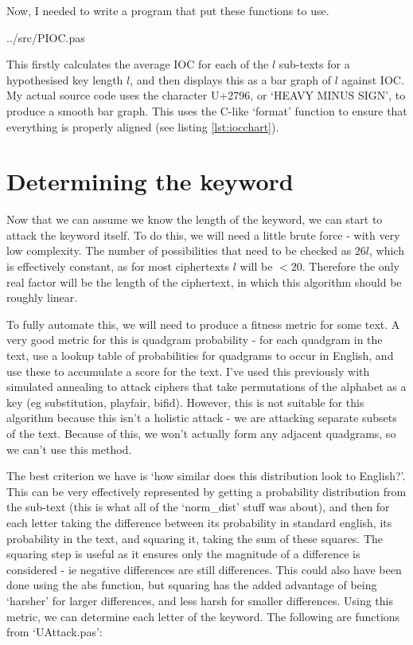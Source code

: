 \documentclass[fleqn,a4paper,11pt]{article}
\begin{document}
    Now, I needed to write a program that put these functions to use.


{../src/PIOC.pas}

    This firstly calculates the average IOC for each of the \(l\) sub-texts for a
    hypothesised key length \(l\), and then displays this as a bar graph of
    \(l\)
    against IOC. My actual source code uses the character U+2796, or `HEAVY
    MINUS SIGN', to produce a smooth bar graph. This uses the C-like `format'
    function to ensure that everything is properly aligned (see listing
    \ref{lst:iocchart}).

    \section{Determining the keyword}

    Now that we can assume we know the length of the keyword, we can start to
    attack the keyword itself. To do this, we will need a little brute force -
    with very low complexity. The number of possibilities that need to be
    checked as \(26l\), which is effectively constant, as for most ciphertexts
    \(l\) will be \(< 20\). Therefore the only real factor will be the length of
    the ciphertext, in which this algorithm should be roughly linear.

    To fully automate this, we will need to produce a fitness metric for some
    text. A very good metric for this is quadgram probability - for each
    quadgram in the text, use a lookup table of probabilities for quadgrams to
    occur in English, and use these to accumulate a score for the text. I've
    used this previously with simulated annealing to attack ciphers that take
    permutations of the alphabet as a key (eg substitution, playfair, bifid).
    However, this is not suitable for this algorithm because this isn't a
    holistic attack - we are attacking separate subsets of the text. Because of
    this, we won't actually form any adjacent quadgrams, so we can't use this
    method.

    The best criterion we have is `how similar does this distribution look to
    English?'. This can be very effectively represented by getting a
    probability distribution from the sub-text (this is what all of the
    `norm\_dist' stuff was about), and then for each letter taking the
    difference between its probability in standard english, its probability in
    the text, and squaring it, taking the sum of these squares. The squaring
    step is useful as it ensures only the magnitude of a difference is
    considered - ie negative differences are still differences. This could also
    have been done using the abs function, but squaring has the added advantage
    of being `harsher' for larger differences, and less harsh for smaller
    differences. Using this metric, we can determine each letter of the
    keyword. The following are functions from `UAttack.pas':
\end{document}
